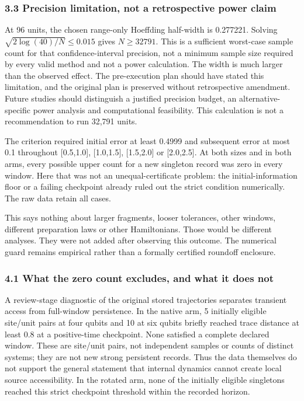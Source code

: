 \documentclass[
  10pt,
  a4paper,
]{article}
\makeatletter
\renewcommand\subsection{\@startsection{subsection}{2}{\z@}{-2ex \@plus -.8ex \@minus -.2ex}{.9ex \@plus .2ex}{\normalfont\large\bfseries}}
\makeatother
\begin{document}
\subsubsection{3.3 Precision limitation, not a retrospective power
claim}\label{precision-limitation-not-a-retrospective-power-claim}

At 96 units, the chosen range-only Hoeffding half-width is 0.277221.
Solving \(\sqrt{2\log(40)/N}\le0.015\) gives \(N\ge32791\). This is a
sufficient worst-case sample count for that confidence-interval
precision, not a minimum sample size required by every valid method and
not a power calculation. The width is much larger than the observed
effect. The pre-execution plan should have stated this limitation, and
the original plan is preserved without retrospective amendment. Future
studies should distinguish a justified precision budget, an
alternative-specific power analysis and computational feasibility. This
calculation is not a recommendation to run 32,791 units.

\subsection{4. Strict new-record
criterion}\label{strict-new-record-criterion}

The criterion required initial error at least 0.4999 and subsequent
error at most 0.1 throughout {[}0.5,1.0{]}, {[}1.0,1.5{]}, {[}1.5,2.0{]}
or {[}2.0,2.5{]}. At both sizes and in both arms, every possible upper
count for a new singleton record was zero in every window. Here that was
not an unequal-certificate problem: the initial-information floor or a
failing checkpoint already ruled out the strict condition numerically.
The raw data retain all cases.

This says nothing about larger fragments, looser tolerances, other
windows, different preparation laws or other Hamiltonians. Those would
be different analyses. They were not added after observing this outcome.
The numerical guard remains empirical rather than a formally certified
roundoff enclosure.

\subsubsection{4.1 What the zero count excludes, and what it does
not}\label{what-the-zero-count-excludes-and-what-it-does-not}

A review-stage diagnostic of the original stored trajectories separates
transient access from full-window persistence. In the native arm, 5
initially eligible site/unit pairs at four qubits and 10 at six qubits
briefly reached trace distance at least 0.8 at a positive-time
checkpoint. None satisfied a complete declared window. These are
site/unit pairs, not independent samples or counts of distinct systems;
they are not new strong persistent records. Thus the data themselves do
not support the general statement that internal dynamics cannot create
local source accessibility. In the rotated arm, none of the initially
eligible singletons reached this strict checkpoint threshold within the
recorded horizon.
\end{document}
